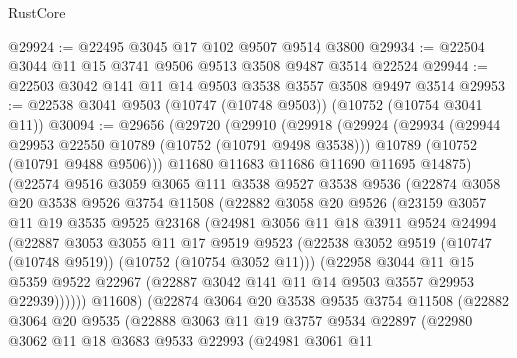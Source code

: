 \begin{lexlean}{RustCore}
\begin{coremodule}
@29924 := @22495 @3045 @17 @102 @9507 @9514 @3800
@29934 := @22504 @3044 @11 @15 @3741 @9506 @9513 @3508 @9487 @3514 @22524
@29944 := @22503 @3042 @141 @11 @14 @9503 @3538 @3557 @3508 @9497 @3514
@29953 := @22538 @3041 @9503 (@10747 (@10748 @9503)) (@10752 (@10754 @3041 @11))
@30094 := @29656
    (@29720
      (@29910
        (@29918
          (@29924
            (@29934
              (@29944 @29953 @22550 @10789 (@10752 (@10791 @9498 @3538)))
              @10789
              (@10752 (@10791 @9488 @9506)))
            @11680
            @11683
            @11686
            @11690
            @11695
            @14875)
          (@22574
            @9516
            @3059
            @3065
            @111
            @3538
            @9527
            @3538
            @9536
            (@22874
              @3058
              @20
              @3538
              @9526
              @3754
              @11508
              (@22882
                @3058
                @20
                @9526
                (@23159
                  @3057
                  @11
                  @19
                  @3535
                  @9525
                  @23168
                  (@24981
                    @3056
                    @11
                    @18
                    @3911
                    @9524
                    @24994
                    (@22887
                      @3053
                      @3055
                      @11
                      @17
                      @9519
                      @9523
                      (@22538 @3052 @9519 (@10747 (@10748 @9519)) (@10752 (@10754 @3052 @11)))
                      (@22958
                        @3044
                        @11
                        @15
                        @5359
                        @9522
                        @22967
                        (@22887 @3042 @141 @11 @14 @9503 @3557 @29953 @22939))))))
              @11608)
            (@22874
              @3064
              @20
              @3538
              @9535
              @3754
              @11508
              (@22882
                @3064
                @20
                @9535
                (@22888
                  @3063
                  @11
                  @19
                  @3757
                  @9534
                  @22897
                  (@22980
                    @3062
                    @11
                    @18
                    @3683
                    @9533
                    @22993
                    (@24981
                      @3061
                      @11

\end{coremodule}
\end{lexlean}
